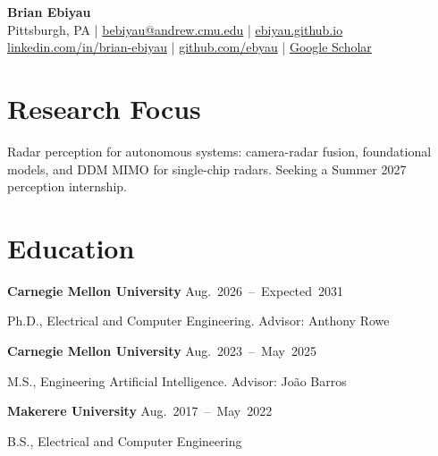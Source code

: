 \documentclass[10pt,letterpaper]{article}
\begin{document}
\begin{center}
  {\LARGE\bfseries Brian Ebiyau}\\[0.35em]
  \small
  Pittsburgh, PA \enspace|\enspace
  \href{mailto:bebiyau@andrew.cmu.edu}{bebiyau@andrew.cmu.edu} \enspace|\enspace
  \href{https://ebiyau.github.io/}{ebiyau.github.io}\\[0.2em]
  \href{https://www.linkedin.com/in/brian-ebiyau/}{linkedin.com/in/brian-ebiyau} \enspace|\enspace
  \href{https://github.com/ebyau}{github.com/ebyau} \enspace|\enspace
  \href{https://scholar.google.com/citations?user=pZlE07AAAAAJ&hl=en}{Google Scholar}
\end{center}

\section{Research Focus}
Radar perception for autonomous systems: camera-radar fusion, foundational models,
and DDM MIMO for single-chip radars. Seeking a Summer 2027 perception internship.

\section{Education}
\textbf{Carnegie Mellon University} \hfill \mbox{Aug. 2026 -- Expected 2031}\par
Ph.D., Electrical and Computer Engineering. Advisor: Anthony Rowe\par\vspace{0.45em}
\textbf{Carnegie Mellon University} \hfill \mbox{Aug. 2023 -- May 2025}\par
M.S., Engineering Artificial Intelligence. Advisor: João Barros\par\vspace{0.45em}
\textbf{Makerere University} \hfill \mbox{Aug. 2017 -- May 2022}\par
B.S., Electrical and Computer Engineering\par

\end{document}

